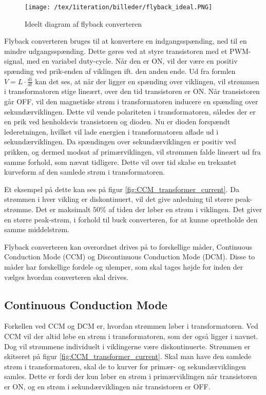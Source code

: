 \begin{figure}[H]
	\center
	\texttt{[image: /tex/1iteration/billeder/flyback\_ideal.PNG]}
	\caption{Ideelt diagram af flyback converteren
	\cite{SMPS-topologies}}
	\label{fig:flyback_ideal}
\end{figure} 

\noindent Flyback converteren bruges til at konvertere en indgangsspænding, ned til en mindre udgangsspænding. Dette gøres ved at styre transistoren med et PWM-signal, med en variabel duty-cycle. Når den er ON, vil der være en positiv spænding ved prik-enden af viklingen ift. den anden ende. Ud fra formlen $V=L\cdot \frac{di}{dt}$ kan det ses, at når der ligger en spænding over viklingen, vil strømmen i transformatoren stige lineært, over den tid transistoren er ON. Når transistoren går OFF, vil den magnetiske strøm i transformatoren inducere en spænding over sekundærviklingen. Dette vil vende polariteten i transformatoren, således der er en prik ved henholdsvis transistoren og dioden. Nu er dioden forspændt lederetningen, hvilket vil lade energien i transformatoren aflade ud i sekundærviklingen. Da spændingen over sekundærviklingen er positiv ved prikken, og dermed modsat af primærviklingen, vil strømmen falde lineært ud fra samme forhold, som nævnt tidligere. Dette vil over tid skabe en trekantet kurveform af den samlede strøm i transformatoren. 

Et eksempel på dette kan ses på figur \ref{fig:CCM_transformer_current}. Da strømmen i hver vikling er diskontinuert, vil det give anledning til større peak-strømme. Det er maksimalt $50\percent$ af tiden der løber en strøm i viklingen. Det giver en større peak-strøm, i forhold til buck converteren, for at kunne opretholde den samme middelstrøm.

Flyback converteren kan overordnet drives på to forskellige måder, Continuous Conduction Mode (CCM) og Discontinuous Conduction Mode (DCM). Disse to måder har forskellige fordele og ulemper, som skal tages højde for inden der vælges hvordan converteren skal drives. 

\subsection{Continuous Conduction Mode}
Forkellen ved CCM og DCM er, hvordan strømmen løber i transformatoren. Ved CCM vil der altid løbe en strøm i transformatoren, som der også ligger i navnet. Dog vil strømmene individuelt i viklingerne være diskontinuerte. Strømmen er skitseret på figur \ref{fig:CCM_transformer_current}. Skal man have den samlede strøm i transformatoren, skal de to kurver for primær- og sekundærviklingen samles. Dette er fordi der kun løber en strøm i primærviklingen når transistoren er ON, og en strøm i sekundærviklingen når transistoren er OFF. 

